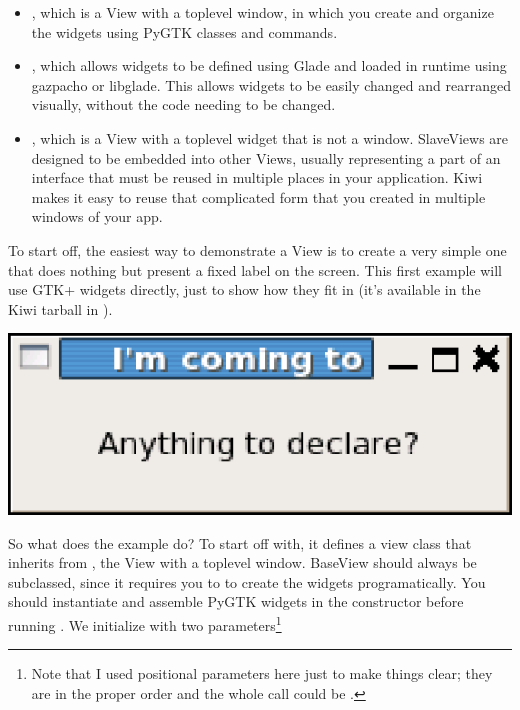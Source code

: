 \documentclass[a4paper]{howto}
\begin{document}
\begin{itemize}
\item {}, which is a View with a toplevel window, in which
you create and organize the widgets using PyGTK classes and commands.
\item {}, which allows widgets to be defined using Glade
and loaded in runtime using gazpacho or libglade. This allows widgets to
be easily changed and rearranged visually, without the code needing
to be changed.
\item {}, which is a View with a toplevel widget that is
not a window. SlaveViews are designed to be embedded into other Views,
usually representing a part of an interface that must be reused in
multiple places in your application. Kiwi makes it easy to reuse that
complicated form that you created in multiple windows of your app.
\end{itemize}

To start off, the easiest way to demonstrate a View is to create a very
simple one that does nothing but present a fixed label on the screen.
This first example will use GTK+ widgets directly, just to show how they
fit in (it's available in the Kiwi tarball in
).

\begin{center}
\includegraphics[scale=0.905]{images/london.eps}
\end{center}




So what does the example do? To start off with, it defines a view class
that inherits from , the View with a toplevel window.
BaseView should always be subclassed, since it requires you to to create
the widgets programatically.  You should instantiate and assemble PyGTK
widgets in the constructor before running
. We initialize  with
two parameters\footnote{Note that I used positional parameters here just
to make things clear; they are in the proper order and the whole call
could be .}
\end{document}
